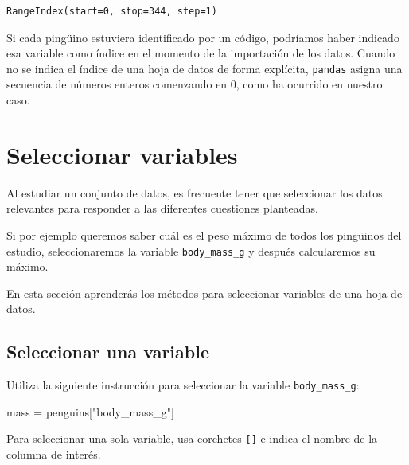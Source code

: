 \documentclass[
  a4paper,
  noprof,
  12pt,
  notoc,
  nosols,
  nobib]{mnye}
\newenvironment{Shaded}{\begin{snugshade}}{\end{snugshade}}
\newcommand{\NormalTok}[1]{\textcolor[rgb]{0.00,0.23,0.31}{#1}}
\newcommand{\OperatorTok}[1]{\textcolor[rgb]{0.37,0.37,0.37}{#1}}
\newcommand{\StringTok}[1]{\textcolor[rgb]{0.13,0.47,0.30}{#1}}
\theoremstyle{definition}
\theoremstyle{remark}
\begin{document}
\begin{verbatim}
RangeIndex(start=0, stop=344, step=1)
\end{verbatim}

Si cada pingüino estuviera identificado por un código, podríamos haber
indicado esa variable como índice en el momento de la importación de los
datos. Cuando no se indica el índice de una hoja de datos de forma
explícita, \texttt{pandas} asigna una secuencia de números enteros
comenzando en 0, como ha ocurrido en nuestro caso.


\hypertarget{seleccionar-variables}{%
\section{Seleccionar variables}\label{seleccionar-variables}}

Al estudiar un conjunto de datos, es frecuente tener que seleccionar los
datos relevantes para responder a las diferentes cuestiones planteadas.

Si por ejemplo queremos saber cuál es el peso máximo de todos los
pingüinos del estudio, seleccionaremos la variable
\texttt{body\_mass\_g} y después calcularemos su máximo.

En esta sección aprenderás los métodos para seleccionar variables de una
hoja de datos.

\hypertarget{seleccionar-una-variable}{%
\subsection{Seleccionar una variable}\label{seleccionar-una-variable}}

Utiliza la siguiente instrucción para seleccionar la variable
\texttt{body\_mass\_g}:

\begin{Shaded}
\begin{Highlighting}[]
\NormalTok{mass }\OperatorTok{=}\NormalTok{ penguins[}\StringTok{"body\_mass\_g"}\NormalTok{]}
\end{Highlighting}
\end{Shaded}

\begin{tcolorbox}[enhanced jigsaw, colframe=quarto-callout-note-color-frame, bottomrule=.15mm, leftrule=.75mm, opacityback=0, toprule=.15mm, arc=.35mm, rightrule=.15mm, colback=white, left=2mm, breakable]
\begin{minipage}[t]{5.5mm}
\textcolor{quarto-callout-note-color}{\faInfo}
\end{minipage}%
\begin{minipage}[t]{\textwidth - 5.5mm}

Para seleccionar una sola variable, usa corchetes \texttt{{[}{]}} e
indica el nombre de la columna de interés.

\end{minipage}%
\end{tcolorbox}
\end{document}
